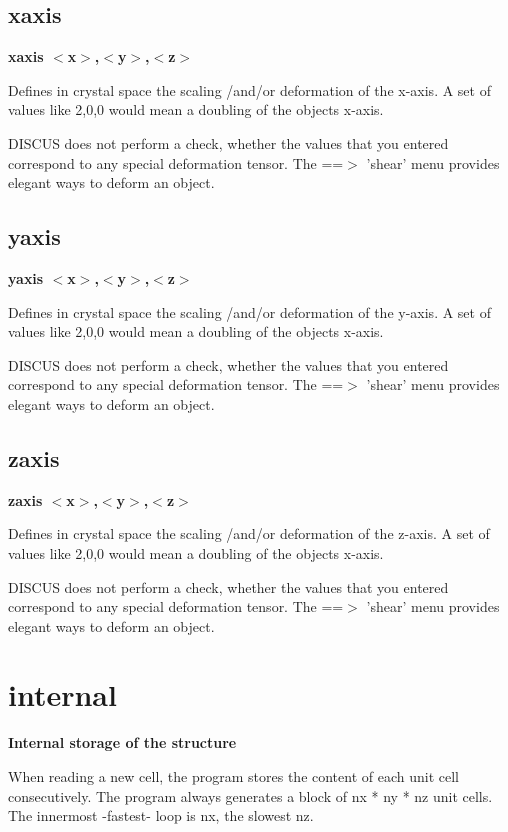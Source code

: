 \subsection*{xaxis}
{\bf xaxis  $ <$x$> $,$ <$y$> $,$ <$z$> $ \par }
\par
\vspace{3pt}
Defines in crystal space the scaling /and/or deformation of the 
x-axis. A set of values like 2,0,0 would mean a doubling of the 
objects x-axis. 
\par
DISCUS does not perform a check, whether the values that you 
entered correspond to any special deformation tensor. The 
==$> $ 'shear' menu provides elegant ways to deform an object. 
\subsection*{yaxis}
{\bf yaxis  $ <$x$> $,$ <$y$> $,$ <$z$> $ \par }
\par
\vspace{3pt}
Defines in crystal space the scaling /and/or deformation of the 
y-axis. A set of values like 2,0,0 would mean a doubling of the 
objects x-axis. 
\par
DISCUS does not perform a check, whether the values that you 
entered correspond to any special deformation tensor. The 
==$> $ 'shear' menu provides elegant ways to deform an object. 
\subsection*{zaxis}
{\bf zaxis  $ <$x$> $,$ <$y$> $,$ <$z$> $ \par }
\par
\vspace{3pt}
Defines in crystal space the scaling /and/or deformation of the 
z-axis. A set of values like 2,0,0 would mean a doubling of the 
objects x-axis. 
\par
DISCUS does not perform a check, whether the values that you 
entered correspond to any special deformation tensor. The 
==$> $ 'shear' menu provides elegant ways to deform an object. 
\section{internal}
{\bf Internal storage of the structure \par }
\par
\vspace{3pt}
When reading a new cell, the program stores the content of each 
unit cell consecutively. The program always generates a block of 
nx * ny * nz unit cells. The innermost -fastest- loop is nx, the 
slowest nz. 

